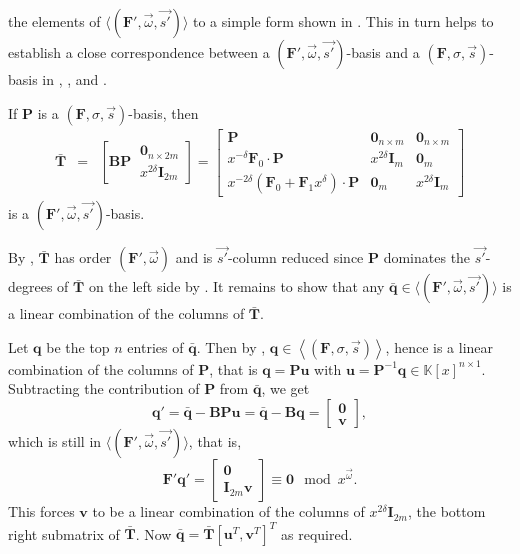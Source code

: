 the elements of $\langle(\mathbf{F}',\vec{\omega},\vec{s'})\rangle$
to a simple form shown in . This in
turn helps to establish a close correspondence between a $(\mathbf{F}',\vec{\omega},\vec{s'})$-basis
and a $\left(\mathbf{F},\sigma,\vec{s}\right)$-basis in ,
, and . 
\begin{lem}
\label{lem:FtoAbasis}If $\mathbf{P}$ is a $\left(\mathbf{F},\sigma,\vec{s}\right)$-basis,
then \begin{eqnarray*}
\bar{\mathbf{T}} & = & \left[\mathbf{B}\mathbf{P}~\begin{array}{|c}
\mathbf{0}_{n\times2m}\\
x^{2\delta}\mathbf{I}_{2m}\end{array}\right]=\left[\begin{array}{r|cc}
\mathbf{P} & \mathbf{0}_{n\times m} & \mathbf{0}_{n\times m}\\
\hline x^{-\delta}\mathbf{F}_{0}\cdot\mathbf{P} & x^{2\delta}\mathbf{I}_{m} & \mathbf{0}_{m}\\
x^{-2\delta}\left(\mathbf{F}_{0}+\mathbf{F}_{1}x^{\delta}\right)\cdot\mathbf{P} & \mathbf{0}_{m} & x^{2\delta}\mathbf{I}_{m}\end{array}\right]\end{eqnarray*}
 is a $(\mathbf{F}',\vec{\omega},\vec{s'})$-basis.\end{lem}
\begin{pf}
By , $\bar{\mathbf{T}}$ has order $(\mathbf{F}',\vec{\omega})$
and is $\vec{s'}$-column reduced since $\mathbf{P}$ dominates the
$\vec{s'}$-degrees of $\bar{\mathbf{T}}$ on the left side by .
It remains to show that any $\bar{\mathbf{q}}\in\langle(\mathbf{F}',\vec{\omega},\vec{s'})\rangle$
is a linear combination of the columns of $\mathbf{\bar{\mathbf{T}}}$.

Let $\mathbf{q}$ be the top $n$ entries of $\bar{\mathbf{q}}$.
Then by , $\mathbf{q}\in\left\langle \left(\mathbf{F},\sigma,\vec{s}\right)\right\rangle $,
hence is a linear combination of the columns of $\mathbf{P}$, that
is $\mathbf{q}=\mathbf{P}\mathbf{u}$ with $\mathbf{u}=\mathbf{P}^{-1}\mathbf{q}\in\mathbb{K}\left[x\right]^{n\times1}$.
Subtracting the contribution of $\mathbf{P}$ from $\bar{\mathbf{q}}$,
we get \[
\mathbf{q}'=\bar{\mathbf{q}}-\mathbf{B}\mathbf{P}\mathbf{u}=\bar{\mathbf{q}}-\mathbf{B}\mathbf{q}=\left[\begin{array}{c}
\mathbf{0}\\
\mathbf{v}\end{array}\right],\]
 which is still in $\langle(\mathbf{F}',\vec{\omega},\vec{s'})\rangle$,
that is, \[
\mathbf{F}'\mathbf{q}'=\begin{bmatrix}\mathbf{0}\\
\mathbf{I}_{2m}\mathbf{v}\end{bmatrix}\equiv\mathbf{0}\mod x^{\vec{\omega}}.\]
 This forces $\mathbf{v}$ to be a linear combination of the columns
of $x^{2\delta}\mathbf{I}_{2m}$, the bottom right submatrix of $\bar{\mathbf{T}}$.
Now $\bar{\mathbf{q}}=\bar{\mathbf{T}}\left[\mathbf{u}^{T},\mathbf{v}^{T}\right]^{T}$
as required.\end{pf}
